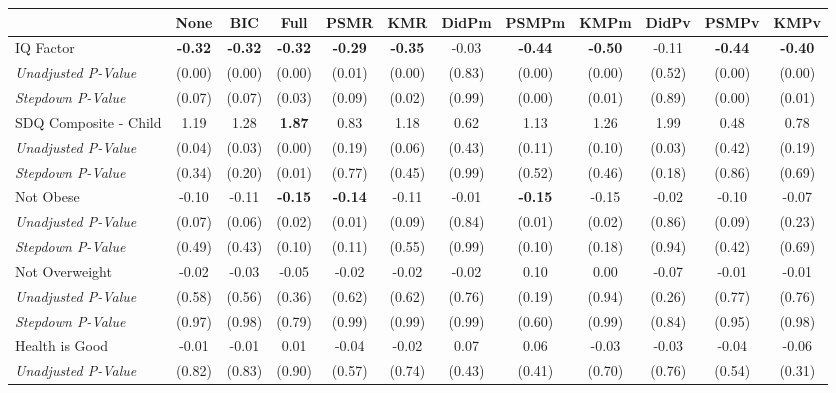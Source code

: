 \begin{tabular}{l c c c c c c c c c c c}
\toprule
 & None & BIC & Full & PSMR & KMR & DidPm & PSMPm & KMPm & DidPv & PSMPv & KMPv \\
\midrule
IQ Factor & \textbf{ -0.32 } & \textbf{ -0.32 } & \textbf{ -0.32 } & \textbf{ -0.29 } & \textbf{ -0.35 } & -0.03 & \textbf{ -0.44 } & \textbf{ -0.50 } & -0.11 & \textbf{ -0.44 } & \textbf{ -0.40 } \\
\quad \textit{Unadjusted P-Value} & (0.00) & (0.00) & (0.00) & (0.01) & (0.00) & (0.83) & (0.00) & (0.00) & (0.52) & (0.00) & (0.00) \\
\quad \textit{Stepdown P-Value} & (0.07) & (0.07) & (0.03) & (0.09) & (0.02) & (0.99) & (0.00) & (0.01) & (0.89) & (0.00) & (0.01) \\
SDQ Composite - Child & 1.19 & 1.28 & \textbf{ 1.87 } & 0.83 & 1.18 & 0.62 & 1.13 & 1.26 & 1.99 & 0.48 & 0.78 \\
\quad \textit{Unadjusted P-Value} & (0.04) & (0.03) & (0.00) & (0.19) & (0.06) & (0.43) & (0.11) & (0.10) & (0.03) & (0.42) & (0.19) \\
\quad \textit{Stepdown P-Value} & (0.34) & (0.20) & (0.01) & (0.77) & (0.45) & (0.99) & (0.52) & (0.46) & (0.18) & (0.86) & (0.69) \\
Not Obese & -0.10 & -0.11 & \textbf{ -0.15 } & \textbf{ -0.14 } & -0.11 & -0.01 & \textbf{ -0.15 } & -0.15 & -0.02 & -0.10 & -0.07 \\
\quad \textit{Unadjusted P-Value} & (0.07) & (0.06) & (0.02) & (0.01) & (0.09) & (0.84) & (0.01) & (0.02) & (0.86) & (0.09) & (0.23) \\
\quad \textit{Stepdown P-Value} & (0.49) & (0.43) & (0.10) & (0.11) & (0.55) & (0.99) & (0.10) & (0.18) & (0.94) & (0.42) & (0.69) \\
Not Overweight & -0.02 & -0.03 & -0.05 & -0.02 & -0.02 & -0.02 & 0.10 & 0.00 & -0.07 & -0.01 & -0.01 \\
\quad \textit{Unadjusted P-Value} & (0.58) & (0.56) & (0.36) & (0.62) & (0.62) & (0.76) & (0.19) & (0.94) & (0.26) & (0.77) & (0.76) \\
\quad \textit{Stepdown P-Value} & (0.97) & (0.98) & (0.79) & (0.99) & (0.99) & (0.99) & (0.60) & (0.99) & (0.84) & (0.95) & (0.98) \\
Health is Good & -0.01 & -0.01 & 0.01 & -0.04 & -0.02 & 0.07 & 0.06 & -0.03 & -0.03 & -0.04 & -0.06 \\
\quad \textit{Unadjusted P-Value} & (0.82) & (0.83) & (0.90) & (0.57) & (0.74) & (0.43) & (0.41) & (0.70) & (0.76) & (0.54) & (0.31) \\

\end{tabular}
